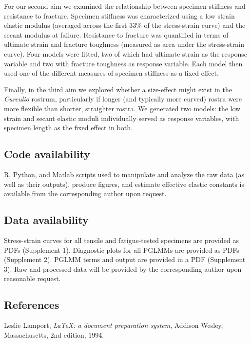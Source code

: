 \documentclass[twocolumn, linenumbers, superscriptaddress, nofootinbib]{revtex4-1}
\begin{document}
				For our second aim we examined the relationship between specimen stiffness and resistance to fracture.
				Specimen stiffness was characterized using a low strain elastic modulus (averaged across the first 33\% of the stress-strain curve) and the secant modulus at failure.
				Resistance to fracture was quantified in terms of ultimate strain and fracture toughness (measured as area under the stress-strain curve).
				Four models were fitted, two of which had ultimate strain as the response variable and two with fracture toughness as response variable.
				Each model then used one of the different measures of specimen stiffness as a fixed effect.
				
				Finally, in the third aim we explored whether a size-effect might exist in the \textit{Curculio} rostrum, particularly if longer (and typically more curved) rostra were more flexible than shorter, straighter rostra.
				We generated two models: the low strain and secant elastic moduli individually served as response variables, with specimen length as the fixed effect in both.

		\subsection*{Code availability}
			R, Python, and Matlab scripts used to manipulate and analyze the raw data (as well as their outputs), produce figures, and estimate effective elastic constants is available from the corresponding author upon request.
			
		\subsection*{Data availability}
			Stress-strain curves for all tensile and fatigue-tested specimens are provided as PDFs (Supplement 1).
			Diagnostic plots for all PGLMMs are provided as PDFs (Supplement 2). PGLMM terms and output are provided in a PDF (Supplement 3). Raw and processed data will be provided by the corresponding author upon reasonable request.

	\begin{thebibliography}{50}
		\section*{References}	
				Leslie Lamport,
				\textit{\LaTeX: a document preparation system},
				Addison Wesley, Massachusetts,
				2nd edition,
				1994.

	\end{thebibliography}
\end{document}
